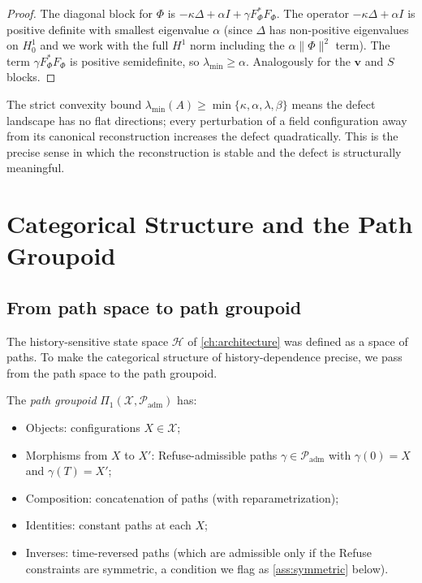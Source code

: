 \documentclass[12pt, oneside]{memoir}
\newcommand{\X}{\mathcal{X}}
\newcommand{\Hcal}{\mathcal{H}}
\newcommand{\Padm}{\mathcal{P}_{\mathrm{adm}}}
\newcommand{\nnorm}[1]{\lVert #1 \rVert}
\newcommand{\bv}{\mathbf{v}}
\begin{document}
\begin{proof}
The diagonal block for $\Phi$ is $-\kappa\Delta + \alpha I + \gamma F_\Phi^* F_\Phi$.
The operator $-\kappa\Delta + \alpha I$ is positive definite with smallest eigenvalue
$\alpha$ (since $\Delta$ has non-positive eigenvalues on $H^1_0$ and we work with the
full $H^1$ norm including the $\alpha\nnorm{\Phi}^2$ term).  The term $\gamma F_\Phi^*
F_\Phi$ is positive semidefinite, so $\lambda_{\min} \ge \alpha$.  Analogously for the
$\bv$ and $S$ blocks.
\end{proof}

The strict convexity bound $\lambda_{\min}(A) \ge \min\{\kappa,\alpha,\lambda,\beta\}$
means the defect landscape has no flat directions; every perturbation of a field
configuration away from its canonical reconstruction increases the defect quadratically.
This is the precise sense in which the reconstruction is stable and the defect is
structurally meaningful.

\chapter{Categorical Structure and the Path Groupoid}
\label{ch:categorical}

\section{From path space to path groupoid}

The history-sensitive state space $\Hcal$ of \cref{ch:architecture} was defined as a
space of paths.  To make the categorical structure of history-dependence precise, we
pass from the path space to the path groupoid.

\begin{definition}
\label{def:groupoid}
The \emph{path groupoid} $\Pi_1(\X, \Padm)$ has:
\begin{itemize}
  \item Objects: configurations $X \in \X$;
  \item Morphisms from $X$ to $X'$: Refuse-admissible paths $\gamma \in \Padm$ with
        $\gamma(0) = X$ and $\gamma(T) = X'$;
  \item Composition: concatenation of paths (with reparametrization);
  \item Identities: constant paths at each $X$;
  \item Inverses: time-reversed paths (which are admissible only if the Refuse
        constraints are symmetric, a condition we flag as \cref{ass:symmetric} below).
\end{itemize}
\end{definition}
\end{document}
